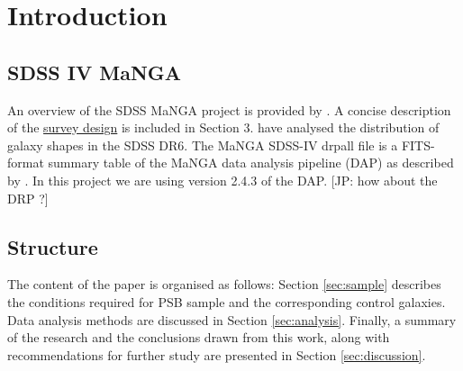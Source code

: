 \section{Introduction}
\label{sec:introduction}



\subsection{SDSS IV MaNGA}
An overview of the SDSS MaNGA project is provided by \citet{2015ApJ...798....7B}. A concise description of the \href{https://iopscience.iop.org/article/10.1088/0004-637X/798/1/7/meta#apj504473s3}{survey design} is included in Section 3. \citet{2008MNRAS.388.1321P} have analysed the distribution of galaxy shapes in the SDSS DR6.
The MaNGA SDSS-IV drpall file is a FITS-format summary table of the MaNGA data analysis pipeline (DAP) as described by \citet{2019arXiv190100856W}. In this project we are using version 2.4.3 of the DAP. [JP: how about the DRP \citet{2016AJ....152...83L}?]



\subsection{Structure}
The content of the paper is organised as follows: Section \ref{sec:sample} describes the conditions required for PSB sample and the corresponding control galaxies. Data analysis methods are discussed in Section \ref{sec:analysis}. Finally, a summary of the research and the conclusions drawn from this work, along with recommendations for further study are presented in Section \ref{sec:discussion}.
